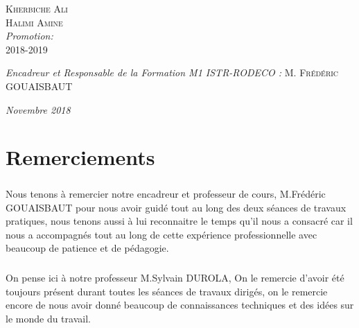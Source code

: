 \documentclass[12pt, a4paper, openany]{report}
\begin{document}
\begin{titlepage}
\begin{sffamily}
\begin{center}
    \begin{minipage}{0.4\textwidth}
      \begin{flushleft} \large
         \textsc{Kherbiche Ali}\\
         \textsc{Halimi Amine}\\
        \emph {Promotion:} \\
         \textsc{2018-2019}\\
      \end{flushleft}
    \end{minipage}
    \begin{minipage}{0.4\textwidth}
      \begin{flushright} \large
        \emph{Encadreur et Responsable de la Formation M1 ISTR-RODECO :}  \textsc{M. Frédéric GOUAISBAUT}\\
      \end{flushright}
    \end{minipage} 

    \vfill

    \emph{\large Novembre 2018}

  \end{center}
  \end{sffamily}      
          
  \end{titlepage}
  
\makeatother



\chapter*{Remerciements}
  
  \paragraph{}
   Nous tenons à remercier notre encadreur et professeur de cours, M.Frédéric GOUAISBAUT pour nous avoir guidé tout au long des deux séances de travaux pratiques, nous tenons aussi à lui reconnaitre le temps qu'il nous a consacré car il nous a accompagnés tout au long de cette expérience professionnelle avec beaucoup de patience et de pédagogie. \\ 
   
  \paragraph{}
   On pense ici à notre professeur M.Sylvain DUROLA, On le remercie d’avoir été toujours présent durant toutes les séances de travaux dirigés, on le remercie encore de nous avoir donné beaucoup de connaissances techniques et des idées sur le monde du travail.\\
 
\end{document}
